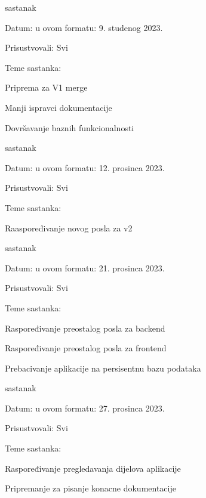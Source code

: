 \begin{packed_enum}
			\item sastanak
			\item[] \begin{packed_item}
				\item Datum: u ovom formatu: 9. studenog 2023.
				\item Prisustvovali: Svi
				\item Teme sastanka:
				\begin{packed_item}
					\item  Priprema za V1 merge
					\item  Manji ispravci dokumentacije
					\item  Dovršavanje baznih funkcionalnosti
				\end{packed_item}
			\end{packed_item}

			\item sastanak
			\item[] \begin{packed_item}
				\item Datum: u ovom formatu: 12. prosinca 2023.
				\item Prisustvovali: Svi
				\item Teme sastanka:
				\begin{packed_item}
					\item  Raaspoređivanje novog posla za v2
				\end{packed_item}
			\end{packed_item}

			\item sastanak
			\item[] \begin{packed_item}
				\item Datum: u ovom formatu: 21. prosinca 2023.
				\item Prisustvovali: Svi
				\item Teme sastanka:
				\begin{packed_item}
					\item  Raspoređivanje preostalog posla za backend
					\item  Raspoređivanje preostalog posla za frontend
					\item  Prebacivanje aplikacije na persisentnu bazu podataka
				\end{packed_item}
			\end{packed_item}

			\item sastanak
			\item[] \begin{packed_item}
				\item Datum: u ovom formatu: 27. prosinca 2023.
				\item Prisustvovali: Svi
				\item Teme sastanka:
				\begin{packed_item}
					\item  Raspoređivanje pregledavanja dijelova aplikacije 
					\item  Pripremanje za pisanje konacne dokumentacije
				\end{packed_item}
			\end{packed_item}


\end{packed_enum}
